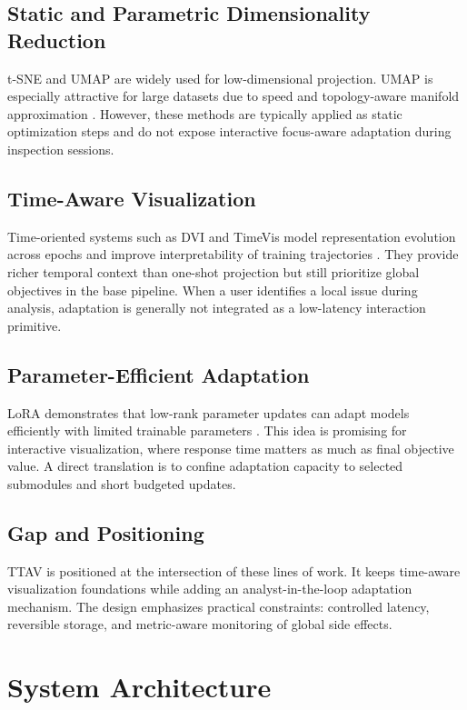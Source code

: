 \documentclass[12pt,a4paper]{report}
\newcommand{\systemname}{TTAV}
\begin{document}
\section{Static and Parametric Dimensionality Reduction}
t-SNE and UMAP are widely used for low-dimensional projection. UMAP is especially attractive for large datasets due to speed and topology-aware manifold approximation \cite{umap2018}. However, these methods are typically applied as static optimization steps and do not expose interactive focus-aware adaptation during inspection sessions.

\section{Time-Aware Visualization}
Time-oriented systems such as DVI and TimeVis model representation evolution across epochs and improve interpretability of training trajectories \cite{dvi,timevis}. They provide richer temporal context than one-shot projection but still prioritize global objectives in the base pipeline. When a user identifies a local issue during analysis, adaptation is generally not integrated as a low-latency interaction primitive.

\section{Parameter-Efficient Adaptation}
LoRA demonstrates that low-rank parameter updates can adapt models efficiently with limited trainable parameters \cite{lora2021}. This idea is promising for interactive visualization, where response time matters as much as final objective value. A direct translation is to confine adaptation capacity to selected submodules and short budgeted updates.

\section{Gap and Positioning}
\systemname{} is positioned at the intersection of these lines of work. It keeps time-aware visualization foundations while adding an analyst-in-the-loop adaptation mechanism. The design emphasizes practical constraints: controlled latency, reversible storage, and metric-aware monitoring of global side effects.

\chapter{System Architecture}
\end{document}
